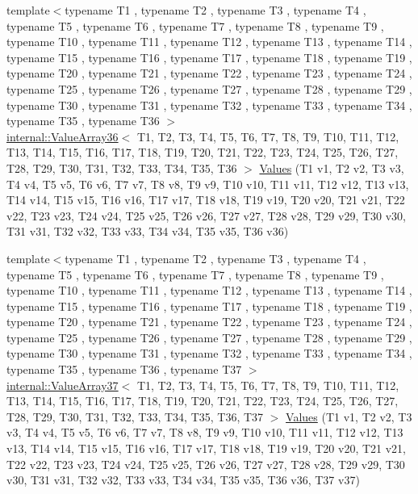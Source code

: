 \begin{DoxyCompactItemize}
{\footnotesize template$<$typename T1 , typename T2 , typename T3 , typename T4 , typename T5 , typename T6 , typename T7 , typename T8 , typename T9 , typename T10 , typename T11 , typename T12 , typename T13 , typename T14 , typename T15 , typename T16 , typename T17 , typename T18 , typename T19 , typename T20 , typename T21 , typename T22 , typename T23 , typename T24 , typename T25 , typename T26 , typename T27 , typename T28 , typename T29 , typename T30 , typename T31 , typename T32 , typename T33 , typename T34 , typename T35 , typename T36 $>$ }\\\mbox{\hyperlink{classtesting_1_1internal_1_1_value_array36}{internal\+::\+Value\+Array36}}$<$ T1, T2, T3, T4, T5, T6, T7, T8, T9, T10, T11, T12, T13, T14, T15, T16, T17, T18, T19, T20, T21, T22, T23, T24, T25, T26, T27, T28, T29, T30, T31, T32, T33, T34, T35, T36 $>$ \mbox{\hyperlink{namespacetesting_ae5d25537f4919c9e82d02c45af4c7c5f}{Values}} (T1 v1, T2 v2, T3 v3, T4 v4, T5 v5, T6 v6, T7 v7, T8 v8, T9 v9, T10 v10, T11 v11, T12 v12, T13 v13, T14 v14, T15 v15, T16 v16, T17 v17, T18 v18, T19 v19, T20 v20, T21 v21, T22 v22, T23 v23, T24 v24, T25 v25, T26 v26, T27 v27, T28 v28, T29 v29, T30 v30, T31 v31, T32 v32, T33 v33, T34 v34, T35 v35, T36 v36)
\item 
{\footnotesize template$<$typename T1 , typename T2 , typename T3 , typename T4 , typename T5 , typename T6 , typename T7 , typename T8 , typename T9 , typename T10 , typename T11 , typename T12 , typename T13 , typename T14 , typename T15 , typename T16 , typename T17 , typename T18 , typename T19 , typename T20 , typename T21 , typename T22 , typename T23 , typename T24 , typename T25 , typename T26 , typename T27 , typename T28 , typename T29 , typename T30 , typename T31 , typename T32 , typename T33 , typename T34 , typename T35 , typename T36 , typename T37 $>$ }\\\mbox{\hyperlink{classtesting_1_1internal_1_1_value_array37}{internal\+::\+Value\+Array37}}$<$ T1, T2, T3, T4, T5, T6, T7, T8, T9, T10, T11, T12, T13, T14, T15, T16, T17, T18, T19, T20, T21, T22, T23, T24, T25, T26, T27, T28, T29, T30, T31, T32, T33, T34, T35, T36, T37 $>$ \mbox{\hyperlink{namespacetesting_aa800bbbe42a44b1776cfd61c9e337ab6}{Values}} (T1 v1, T2 v2, T3 v3, T4 v4, T5 v5, T6 v6, T7 v7, T8 v8, T9 v9, T10 v10, T11 v11, T12 v12, T13 v13, T14 v14, T15 v15, T16 v16, T17 v17, T18 v18, T19 v19, T20 v20, T21 v21, T22 v22, T23 v23, T24 v24, T25 v25, T26 v26, T27 v27, T28 v28, T29 v29, T30 v30, T31 v31, T32 v32, T33 v33, T34 v34, T35 v35, T36 v36, T37 v37)
\item 

\end{DoxyCompactItemize}
